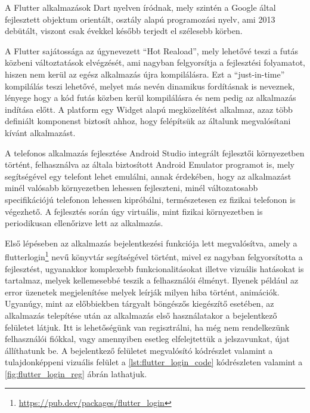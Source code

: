 A Flutter alkalmazások Dart nyelven íródnak, mely szintén a Google által fejlesztett objektum orientált, osztály alapú programozási nyelv, ami 2013 debütált, viszont csak évekkel később terjedt el szélesebb körben.

A Flutter sajátossága az úgynevezett “Hot Reaload”, mely lehetővé teszi a futás közbeni változtatások elvégzését, ami nagyban felgyorsítja a fejlesztési folyamatot, hiszen nem kerül az egész alkalmazás újra kompilálásra. Ezt a “just-in-time” kompilálás teszi lehetővé, melyet más nevén dinamikus fordításnak is neveznek, lényege hogy a kód futás közben kerül kompilálásra és nem pedig az alkalmazás indítása előtt. A platform egy Widget alapú megközelítést alkalmaz, azaz több definiált komponenst biztosít ahhoz, hogy felépítsük az általunk megvalósítani kívánt alkalmazást.

A telefonos alkalmazás fejlesztése Android Studio integrált fejlesztői környezetben történt, felhasználva az általa biztosított Android Emulator programot is, mely segítségével egy telefont lehet emulálni, annak érdekében, hogy az alkalmazást minél valósabb környezetben lehessen fejleszteni, minél változatosabb specifikációjú telefonon lehessen kipróbálni, természetesen ez fizikai telefonon is végezhető. A fejlesztés során úgy virtuális, mint fizikai környezetben is periodikusan ellenőrizve lett az alkalmazás.

Első lépéseben az alkalmazás bejelentkezési funkciója lett megvalósítva, amely a flutter\textunderscore login\footnote{\url{ https://pub.dev/packages/flutter_login}} nevű könyvtár segítségével történt, mivel ez nagyban felgyorsította a fejlesztést, ugyanakkor komplexebb funkcionalitásokat illetve vizuális hatásokat is tartalmaz, melyek kellemesebbé teszik a felhasználói élményt. Ilyenek például az error üzenetek megjelenítése melyek leírják milyen hiba történt, animációk. Ugyanúgy, mint az előbbiekben tárgyalt böngészős kiegészítő esetében, az alkalmazás telepítése után az alkalmazás első használatakor a bejelentkező felületet látjuk. Itt is lehetőségünk van regisztrálni, ha még nem rendelkezünk felhasználói fiókkal, vagy amennyiben esetleg elfelejtettük a jelszavunkat, újat állíthatunk be. A bejelentkező felületet megvalósító kódrészlet valamint a tulajdonképpeni vizuális felület a \ref{lst:flutter_login_code} kódrészleten valamint a \ref{fig:flutter_login_reg} ábrán lathatjuk.



